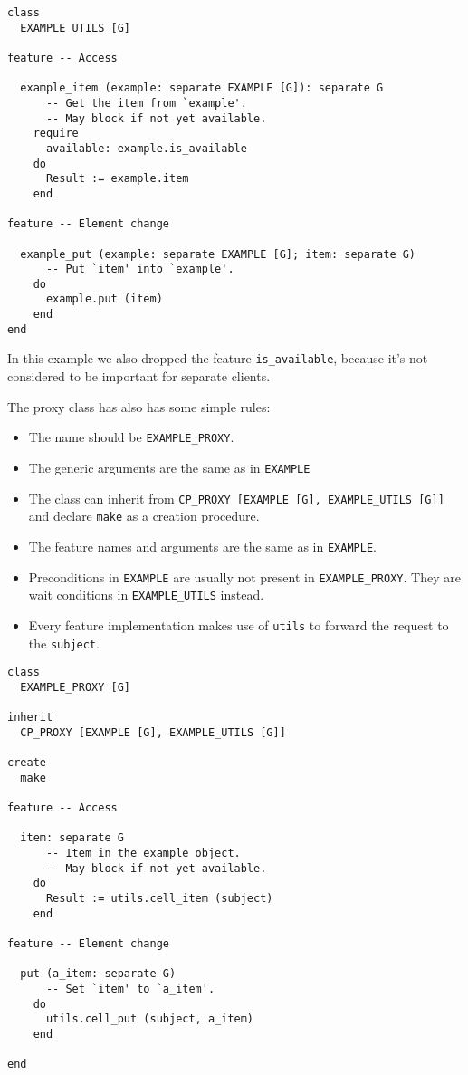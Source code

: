 \documentclass[a4paper,10pt]{report}
\begin{document}
\begin{lstlisting}
class
  EXAMPLE_UTILS [G]
  
feature -- Access

  example_item (example: separate EXAMPLE [G]): separate G
      -- Get the item from `example'.
      -- May block if not yet available.
    require
      available: example.is_available
    do
      Result := example.item
    end

feature -- Element change
 
  example_put (example: separate EXAMPLE [G]; item: separate G)
      -- Put `item' into `example'.
    do
      example.put (item)
    end
end
\end{lstlisting}

In this example we also dropped the feature \lstinline!is_available!, because it's not considered to be important for separate clients.

The proxy class has also has some simple rules:

 \begin{itemize}
  \item The name should be \lstinline!EXAMPLE_PROXY!.
  \item The generic arguments are the same as in \lstinline!EXAMPLE!
  \item The class can inherit from \lstinline!CP_PROXY [EXAMPLE [G], EXAMPLE_UTILS [G]]! and declare \lstinline!make! as a creation procedure.
  \item The feature names and arguments are the same as in \lstinline!EXAMPLE!.
  \item Preconditions in \lstinline!EXAMPLE! are usually not present in \lstinline!EXAMPLE_PROXY!. They are wait conditions in \lstinline!EXAMPLE_UTILS! instead.
  \item Every feature implementation makes use of \lstinline!utils! to forward the request to the \lstinline!subject!.
 \end{itemize}

\begin{lstlisting}
class
  EXAMPLE_PROXY [G]

inherit
  CP_PROXY [EXAMPLE [G], EXAMPLE_UTILS [G]]

create
  make
  
feature -- Access

  item: separate G
      -- Item in the example object.
      -- May block if not yet available.
    do
      Result := utils.cell_item (subject)
    end

feature -- Element change

  put (a_item: separate G)
      -- Set `item' to `a_item'.
    do
      utils.cell_put (subject, a_item)
    end

end
\end{lstlisting}
\end{document}
